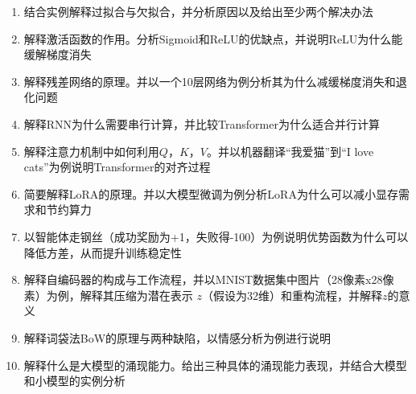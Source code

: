 \begin{enumerate}

\item 结合实例解释过拟合与欠拟合，并分析原因以及给出至少两个解决办法

\item 解释激活函数的作用。分析Sigmoid和ReLU的优缺点，并说明ReLU为什么能缓解梯度消失

\item 解释残差网络的原理。并以一个10层网络为例分析其为什么减缓梯度消失和退化问题

\item 解释RNN为什么需要串行计算，并比较Transformer为什么适合并行计算

\item 解释注意力机制中如何利用$Q$，$K$，$V$。并以机器翻译“我爱猫”到“I love cats”为例说明Transformer的对齐过程

\item 简要解释LoRA的原理。并以大模型微调为例分析LoRA为什么可以减小显存需求和节约算力

\item 以智能体走钢丝（成功奖励为+1，失败得-100）为例说明优势函数为什么可以降低方差，从而提升训练稳定性

\item 解释自编码器的构成与工作流程，并以MNIST数据集中图片（28像素x28像素）为例，解释其压缩为潜在表示
$z$（假设为32维）和重构流程，并解释$z$的意义

\item 解释词袋法BoW的原理与两种缺陷，以情感分析为例进行说明

\item 解释什么是大模型的涌现能力。给出三种具体的涌现能力表现，并结合大模型和小模型的实例分析

\end{enumerate}